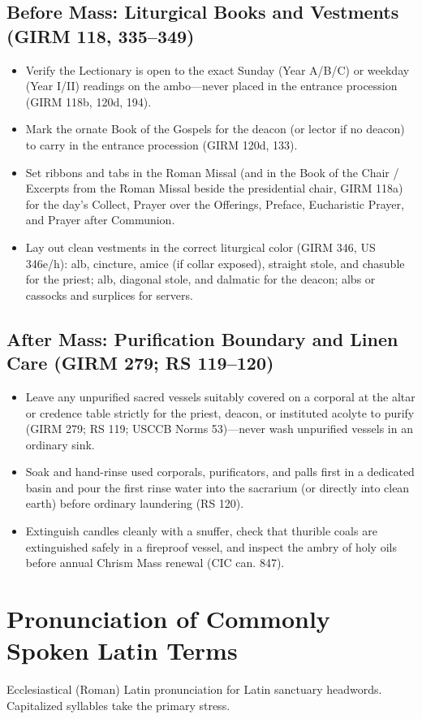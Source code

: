 \subsection*{Before Mass: Liturgical Books and Vestments (GIRM 118, 335--349)}
\begin{itemize}
\item Verify the Lectionary is open to the exact Sunday (Year A/B/C) or weekday (Year I/II) readings on the ambo---never placed in the entrance procession (GIRM 118b, 120d, 194).
\item Mark the ornate Book of the Gospels for the deacon (or lector if no deacon) to carry in the entrance procession (GIRM 120d, 133).
\item Set ribbons and tabs in the Roman Missal (and in the Book of the Chair / Excerpts from the Roman Missal beside the presidential chair, GIRM 118a) for the day's Collect, Prayer over the Offerings, Preface, Eucharistic Prayer, and Prayer after Communion.
\item Lay out clean vestments in the correct liturgical color (GIRM 346, US 346e/h): alb, cincture, amice (if collar exposed), straight stole, and chasuble for the priest; alb, diagonal stole, and dalmatic for the deacon; albs or cassocks and surplices for servers.
\end{itemize}
\subsection*{After Mass: Purification Boundary and Linen Care (GIRM 279; RS 119--120)}
\begin{itemize}
\item Leave any unpurified sacred vessels suitably covered on a corporal at the altar or credence table strictly for the priest, deacon, or instituted acolyte to purify (GIRM 279; RS 119; USCCB Norms 53)---never wash unpurified vessels in an ordinary sink.
\item Soak and hand-rinse used corporals, purificators, and palls first in a dedicated basin and pour the first rinse water into the sacrarium (or directly into clean earth) before ordinary laundering (RS 120).
\item Extinguish candles cleanly with a snuffer, check that thurible coals are extinguished safely in a fireproof vessel, and inspect the ambry of holy oils before annual Chrism Mass renewal (CIC can. 847).
\end{itemize}

\clearpage
\section{Pronunciation of Commonly Spoken Latin Terms}
Ecclesiastical (Roman) Latin pronunciation for Latin sanctuary headwords. Capitalized syllables take the primary stress.

